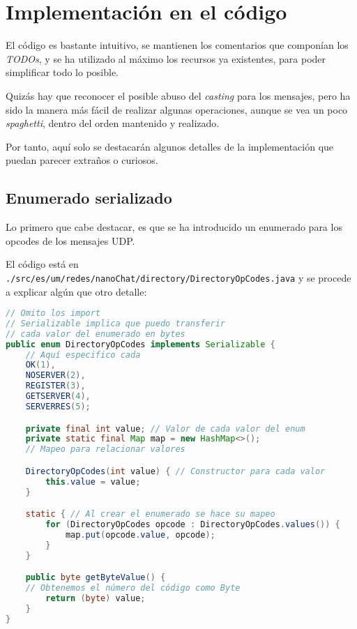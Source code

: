 \documentclass{article}
\begin{document}
\section{Implementación en el código}

El código es bastante intuitivo, se mantienen los comentarios que componían los \textit{TODOs}, y se ha utilizado al máximo los recursos ya existentes, para poder simplificar todo lo posible.

Quizás hay que reconocer el posible abuso del \textit{casting} para los mensajes, pero ha sido la manera más fácil de realizar algunas operaciones, aunque se vea un poco \textit{spaghetti}, dentro del orden mantenido y realizado.

Por tanto, aquí solo se destacarán algunos detalles de la implementación que puedan parecer extraños o curiosos.

\subsection{Enumerado serializado}

Lo primero que cabe destacar, es que se ha introducido un enumerado para los opcodes de los mensajes UDP.

El código está en \texttt{./src/es/um/redes/nanoChat/directory/DirectoryOpCodes.java} y se procede a explicar algún que otro detalle:

\begin{lstlisting}[language=Java, caption=Parte del código]
// Omito los import
// Serializable implica que puedo transferir
// cada valor del enumerado en bytes
public enum DirectoryOpCodes implements Serializable {
    // Aquí especifico cada 
    OK(1),
    NOSERVER(2),
    REGISTER(3),
    GETSERVER(4),
    SERVERRES(5);

    private final int value; // Valor de cada valor del enum
    private static final Map map = new HashMap<>(); 
    // Mapeo para relacionar valores

    DirectoryOpCodes(int value) { // Constructor para cada valor
        this.value = value;
    }

    static { // Al crear el enumerado se hace su mapeo
        for (DirectoryOpCodes opcode : DirectoryOpCodes.values()) {
            map.put(opcode.value, opcode);
        }
    }

    public byte getByteValue() {
    // Obtenemos el número del código como Byte
        return (byte) value;
    }
}
\end{lstlisting}
\end{document}
